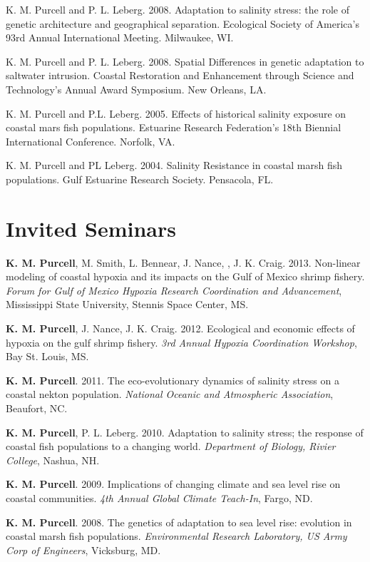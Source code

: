 \documentclass[letterpaper]{article}
\renewenvironment{itemize}{
  \begin{list}{}{
    \setlength{\leftmargin}{1em}
  }
}{
  \end{list}
}
\begin{document}
\begin{itemize}
		\item K. M. Purcell and P. L. Leberg. 2008. Adaptation to salinity stress: the role of genetic architecture and geographical separation. Ecological Society of America’s 93rd Annual International Meeting. Milwaukee, WI.
		\item K. M. Purcell and P. L. Leberg. 2008. Spatial Differences in genetic adaptation to saltwater intrusion. Coastal Restoration and Enhancement through Science and Technology’s Annual Award Symposium. New Orleans, LA.
		\item K. M. Purcell and P.L. Leberg. 2005. Effects of historical salinity exposure on coastal mars fish populations. Estuarine Research Federation’s 18th Biennial International Conference. Norfolk, VA.
		\item K. M. Purcell and PL Leberg. 2004. Salinity Resistance in coastal marsh fish populations. Gulf Estuarine Research Society. Pensacola, FL.
	\end{itemize}

\section*{Invited Seminars}
	\begin{itemize}
		 \item \textbf{K. M. Purcell}, M. Smith, L. Bennear, J. Nance, , J. K. Craig. 2013. Non-linear modeling of coastal hypoxia and its impacts on the Gulf of Mexico shrimp fishery. \textit{Forum for Gulf of Mexico Hypoxia Research Coordination and Advancement}, Mississippi State University, Stennis Space Center, MS.
		 \item \textbf{K. M. Purcell}, J. Nance, J. K. Craig. 2012. Ecological and economic effects of hypoxia on the gulf shrimp fishery. \textit{3rd Annual Hypoxia Coordination Workshop}, Bay St. Louis, MS.
		 \item \textbf{K. M. Purcell}. 2011. The eco-evolutionary dynamics of salinity stress on a coastal nekton population. \textit{National Oceanic and Atmospheric Association}, Beaufort, NC.
		 \item \textbf{K. M. Purcell}, P. L. Leberg. 2010. Adaptation to salinity stress; the response of coastal fish populations to a changing world. \textit{Department of Biology, Rivier College}, Nashua, NH.
		 \item \textbf{K. M. Purcell}. 2009. Implications of changing climate and sea level rise on coastal communities. \textit{4th Annual Global Climate Teach-In}, Fargo, ND.
		 \item \textbf{K. M. Purcell}. 2008. The genetics of adaptation to sea level rise: evolution in coastal marsh fish populations. \textit{Environmental Research Laboratory, US Army Corp of Engineers}, Vicksburg, MD.
	\end{itemize}
\end{document}
